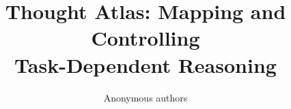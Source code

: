 \documentclass[11pt]{article}
\title{Thought Atlas: Mapping and Controlling\\Task-Dependent Reasoning}
\author{Anonymous authors}
\begin{document}
\maketitle






\FloatBarrier


\clearpage
\appendix


\end{document}
